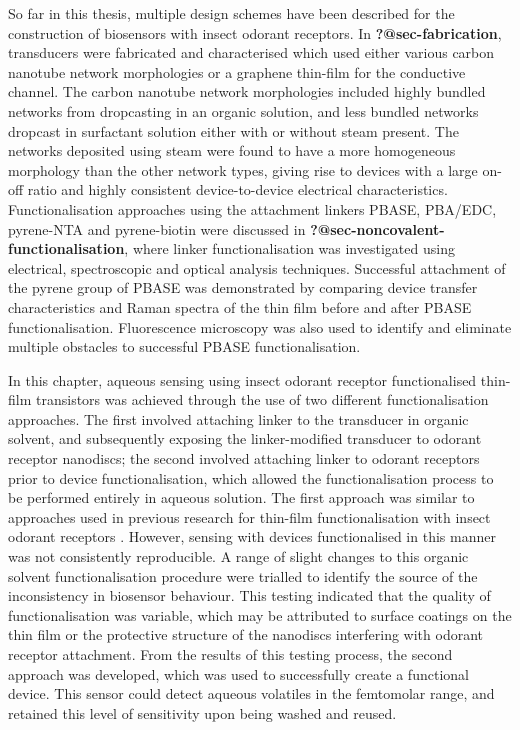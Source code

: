 \documentclass[
  a4paper,
]{scrbook}
\begin{document}
So far in this thesis, multiple design schemes have been described for
the construction of biosensors with insect odorant receptors. In
\textbf{?@sec-fabrication}, transducers were fabricated and
characterised which used either various carbon nanotube network
morphologies or a graphene thin-film for the conductive channel. The
carbon nanotube network morphologies included highly bundled networks
from dropcasting in an organic solution, and less bundled networks
dropcast in surfactant solution either with or without steam present.
The networks deposited using steam were found to have a more homogeneous
morphology than the other network types, giving rise to devices with a
large on-off ratio and highly consistent device-to-device electrical
characteristics. Functionalisation approaches using the attachment
linkers PBASE, PBA/EDC, pyrene-NTA and pyrene-biotin were discussed in
\textbf{?@sec-noncovalent-functionalisation}, where linker
functionalisation was investigated using electrical, spectroscopic and
optical analysis techniques. Successful attachment of the pyrene group
of PBASE was demonstrated by comparing device transfer characteristics
and Raman spectra of the thin film before and after PBASE
functionalisation. Fluorescence microscopy was also used to identify and
eliminate multiple obstacles to successful PBASE functionalisation.

In this chapter, aqueous sensing using insect odorant receptor
functionalised thin-film transistors was achieved through the use of two
different functionalisation approaches. The first involved attaching
linker to the transducer in organic solvent, and subsequently exposing
the linker-modified transducer to odorant receptor nanodiscs; the second
involved attaching linker to odorant receptors prior to device
functionalisation, which allowed the functionalisation process to be
performed entirely in aqueous solution. The first approach was similar
to approaches used in previous research for thin-film functionalisation
with insect odorant receptors \autocite{Murugathas2019a,Murugathas2020}.
However, sensing with devices functionalised in this manner was not
consistently reproducible. A range of slight changes to this organic
solvent functionalisation procedure were trialled to identify the source
of the inconsistency in biosensor behaviour. This testing indicated that
the quality of functionalisation was variable, which may be attributed
to surface coatings on the thin film or the protective structure of the
nanodiscs interfering with odorant receptor attachment. From the results
of this testing process, the second approach was developed, which was
used to successfully create a functional device. This sensor could
detect aqueous volatiles in the femtomolar range, and retained this
level of sensitivity upon being washed and reused.
\end{document}
